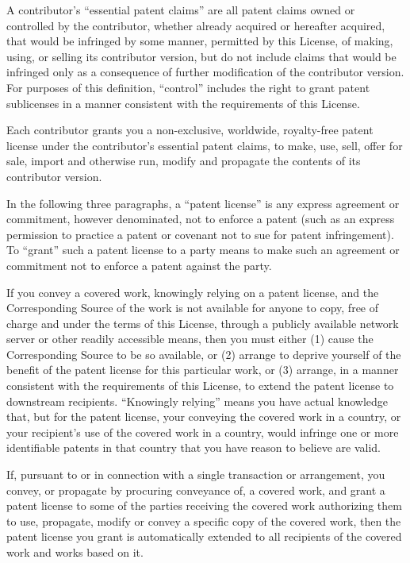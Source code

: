 \documentclass[11pt]{article}
\begin{document}
\begin{enumerate}
A contributor's ``essential patent claims'' are all patent claims
owned or controlled by the contributor, whether already acquired or
hereafter acquired, that would be infringed by some manner, permitted
by this License, of making, using, or selling its contributor version,
but do not include claims that would be infringed only as a
consequence of further modification of the contributor version.  For
purposes of this definition, ``control'' includes the right to grant
patent sublicenses in a manner consistent with the requirements of
this License.

Each contributor grants you a non-exclusive, worldwide, royalty-free
patent license under the contributor's essential patent claims, to
make, use, sell, offer for sale, import and otherwise run, modify and
propagate the contents of its contributor version.

In the following three paragraphs, a ``patent license'' is any express
agreement or commitment, however denominated, not to enforce a patent
(such as an express permission to practice a patent or covenant not to
sue for patent infringement).  To ``grant'' such a patent license to a
party means to make such an agreement or commitment not to enforce a
patent against the party.

If you convey a covered work, knowingly relying on a patent license,
and the Corresponding Source of the work is not available for anyone
to copy, free of charge and under the terms of this License, through a
publicly available network server or other readily accessible means,
then you must either (1) cause the Corresponding Source to be so
available, or (2) arrange to deprive yourself of the benefit of the
patent license for this particular work, or (3) arrange, in a manner
consistent with the requirements of this License, to extend the patent
license to downstream recipients.  ``Knowingly relying'' means you have
actual knowledge that, but for the patent license, your conveying the
covered work in a country, or your recipient's use of the covered work
in a country, would infringe one or more identifiable patents in that
country that you have reason to believe are valid.

If, pursuant to or in connection with a single transaction or
arrangement, you convey, or propagate by procuring conveyance of, a
covered work, and grant a patent license to some of the parties
receiving the covered work authorizing them to use, propagate, modify
or convey a specific copy of the covered work, then the patent license
you grant is automatically extended to all recipients of the covered
work and works based on it.


\end{enumerate}
\end{document}
